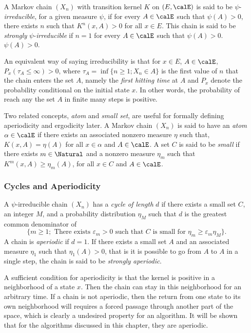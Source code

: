 A Markov chain $(X_n)$ with transition kernel $K$ on $(E,\calE)$ is said to be
$\psi$-\emph{irreducible}, for a given measure $\psi$, if for every
$A\in\calE$ such that $\psi(A)>0$, there exists $n$ such that $K^n(x,A)>0$ for
all $x\in E$. This chain is said to be \emph{strongly}
$\psi$-\emph{irreducible} if $n=1$ for every $A\in\calE$ such that
$\psi(A)>0$.
$\psi(A)>0$.

An equivalent way of saying irreducibility is that for $x\in E$, $A\in\calE$,
$P_x(\tau_A\le\infty) > 0$, where $\tau_A = \inf\{n\ge1;X_n\in A\}$ is the
first value of $n$ that the chain enters the set $A$, namely the \emph{first
  hitting time} at $A$ and $P_x$ denote the probability conditional on the
initial state $x$. In other words, the probability of reach any the set $A$ in
finite many steps is positive.

Two related concepts, \emph{atom} and \emph{small set}, are useful for
formally defining aperiodicity and ergodicity later. A Markov chain $(X_n)$ is
said to have an \emph{atom} $\alpha\in\calE$ if there exists an associated
nonzero measure $\eta$ such that, $K(x,A) = \eta(A)$ for all $x\in\alpha$ and
$A\in\calE$. A set $C$ is said to be \emph{small} if there exists
$m\in\Natural$ and a nonzero measure $\eta_m$ such that
$K^m(x,A)\ge\eta_m(A)$, for all $x\in C$ and $A\in\calE$.

\subsubsection{Cycles and Aperiodicity}
\label{ssub:Cycles and Aperiodicity}

A $\psi$-irreducible chain $(X_n)$ has a \emph{cycle of length} $d$ if there
exists a small set $C$, an integer $M$, and a probability distribution
$\eta_M$ such that $d$ is the greatest common denominator of
\begin{equation*}
  \{m\ge1;\text{ There exists }\varepsilon_m > 0\text{ such that }C\text{ is
    small for }\eta_m\ge\varepsilon_m\eta_M\}.
\end{equation*}
A chain is \emph{aperiodic} if $d = 1$. If there exists a small set $A$ and an
associated measure $\eta_1$ such that $\eta_1(A) > 0$, that is it is possible
to go from $A$ to $A$ in a single step, the chain is said to be
\emph{strongly aperiodic}.

A sufficient condition for aperiodicity is that the kernel is positive in a
neighborhood of a state $x$. Then the chain can stay in this neighborhood for
an arbitrary time. If a chain is not aperiodic, then the return from one state
to its own neighborhood will requires a forced passage through another part of
the space, which is clearly a undesired property for an \mcmc algorithm. It
will be shown that for the algorithms discussed in this chapter, they are
aperiodic.

